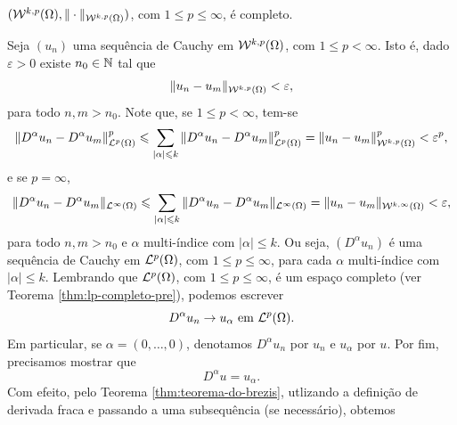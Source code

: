 \begin{tbox} \label{thm:sobolev-completo}
    $(\mathcal{W}^{k,p}(\Omega), \Vert \cdot \Vert_{\mathcal{W}^{k,p}(\Omega)})$, com $1 \leqslant p \leqslant \infty$, é completo.
\end{tbox}
\begin{prf}
    Seja $(u_n)$ uma sequência de Cauchy em $\mathcal{W}^{k,p}(\Omega)$, com $1 \leqslant p < \infty$. Isto é, dado $\varepsilon > 0$ existe $n_0 \in \mathbb{N}$ tal que
    \[
        \Vert u_n - u_m \Vert_{\mathcal{W}^{k,p}(\Omega)} < \varepsilon,
    \]
    para todo $n,m > n_0$.
    Note que, se $1 \leqslant p < \infty$, tem-se
    \[
        \Vert D^\alpha u_n - D^\alpha u_m \Vert_{\mathcal{L}^p(\Omega)}^p \leqslant \sum_{|\alpha| \leqslant k} \Vert D^\alpha u_n - D^\alpha u_m \Vert_{\mathcal{L}^p(\Omega)}^p = \Vert u_n - u_m \Vert_{\mathcal{W}^{k,p}(\Omega)}^p < \varepsilon^p,
    \]
    e se $p = \infty$,
    \[
        \Vert D^\alpha u_n - D^\alpha u_m \Vert_{\mathcal{L}^\infty(\Omega)} \leqslant \sum_{|\alpha| \leqslant k} \Vert D^\alpha u_n - D^\alpha u_m \Vert_{\mathcal{L}^\infty(\Omega)} = \Vert u_n - u_m \Vert_{\mathcal{W}^{k,\infty}(\Omega)} < \varepsilon,
    \]
    para todo $n,m > n_0$ e $\alpha$ multi-índice com $|\alpha| \leqslant k$. Ou seja, $(D^\alpha u_n)$ é uma sequência de Cauchy em $\mathcal{L}^p(\Omega)$, com $1 \leqslant p \leqslant \infty$, para cada $\alpha$ multi-índice com $|\alpha| \leqslant k$. Lembrando que $\mathcal{L}^p(\Omega)$, com $1 \leqslant p \leqslant \infty$, é um espaço completo (ver Teorema \ref{thm:lp-completo-pre}), podemos escrever
    \begin{equation} \label{eq:Dalfaun}
        D^\alpha u_n \to u_\alpha \text{ em } \mathcal{L}^p(\Omega).
    \end{equation}
    Em particular, se $\alpha = (0,\dots,0)$, denotamos $D^\alpha u_n$ por $u_n$ e $u_\alpha$ por $u$.
    Por fim, precisamos mostrar que
    \[
        D^\alpha u = u_\alpha.
    \]
Com efeito, pelo Teorema \ref{thm:teorema-do-brezis}, utlizando a definição de derivada fraca e passando a uma subsequência (se necessário), obtemos
    \[
        \begin{aligned}

\end{aligned}\]
\end{prf}
